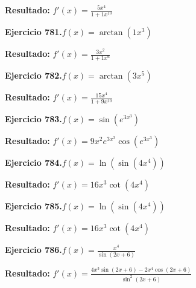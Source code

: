 \documentclass[10pt,a4paper]{article}
\begin{document}
\begin{solbox}
\textbf{Resultado:} \(\displaystyle f'(x) = \frac{5x^{4}}{1+1x^{10}}\)
\end{solbox}

\newpage
\begin{ejbox}
\textbf{Ejercicio 781.}\quad $f(x) = \arctan(1x^{3})$
\end{ejbox}

\begin{solbox}
\textbf{Resultado:} \(\displaystyle f'(x) = \frac{3x^{2}}{1+1x^{6}}\)
\end{solbox}

\begin{ejbox}
\textbf{Ejercicio 782.}\quad $f(x) = \arctan(3x^{5})$
\end{ejbox}

\begin{solbox}
\textbf{Resultado:} \(\displaystyle f'(x) = \frac{15x^{4}}{1+9x^{10}}\)
\end{solbox}

\begin{ejbox}
\textbf{Ejercicio 783.}\quad $f(x) = \sin(e^{3x^{3}})$
\end{ejbox}

\begin{solbox}
\textbf{Resultado:} \(\displaystyle f'(x) = 9x^{2}e^{3x^{3}}\cos(e^{3x^{3}})\)
\end{solbox}

\newpage
\begin{ejbox}
\textbf{Ejercicio 784.}\quad $f(x) = \ln(\sin(4x^{4}))$
\end{ejbox}

\begin{solbox}
\textbf{Resultado:} \(\displaystyle f'(x) = 16x^{3}\cot(4x^{4})\)
\end{solbox}

\begin{ejbox}
\textbf{Ejercicio 785.}\quad $f(x) = \ln(\sin(4x^{4}))$
\end{ejbox}

\begin{solbox}
\textbf{Resultado:} \(\displaystyle f'(x) = 16x^{3}\cot(4x^{4})\)
\end{solbox}

\begin{ejbox}
\textbf{Ejercicio 786.}\quad $f(x) = \frac{x^{4}}{\sin(2x +6)}$
\end{ejbox}

\begin{solbox}
\textbf{Resultado:} \(\displaystyle f'(x) = \frac{4x^{3}\sin(2x +6) - 2x^{4}\cos(2x +6)}{\sin^2(2x +6)}\)
\end{solbox}
\end{document}
